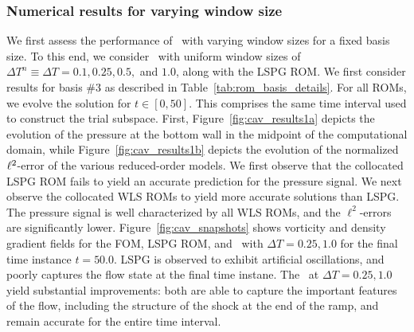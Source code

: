 \subsubsection{Numerical results for varying window size}
We first assess the performance of \methodAcronymROMs\ with varying window sizes for a fixed basis size. To this end, we consider \methodAcronymROMs\ with uniform window 
sizes of $\Delta T^n \equiv \Delta T = 0.1,0.25,0.5,$ and $1.0$, along with the LSPG ROM. We first consider results for basis \#3 as described in 
Table~\ref{tab:rom_basis_details}. For all ROMs, we evolve 
the solution for $t \in [0,50]$. This comprises the same time interval used to construct the trial subspace. First, Figure~\ref{fig:cav_results1a} depicts the evolution of the pressure at the bottom wall in the midpoint of the computational domain, while Figure~\ref{fig:cav_results1b} depicts the evolution of the normalized $\ell^2$-error of the various reduced-order models. We first observe that the collocated LSPG ROM fails to yield an accurate prediction for the pressure signal. We next observe the collocated WLS ROMs to yield more accurate solutions than LSPG. The pressure signal is well characterized by all WLS ROMs, and the $\ell^2$-errors are significantly lower. 
Figure~\ref{fig:cav_snapshots} shows vorticity and density gradient fields for the FOM, LSPG ROM, and \methodAcronymROMs\ with $\Delta T = 0.25,1.0$ for the final time instance $t = 50.0$. LSPG is observed to exhibit artificial oscillations, and poorly captures the flow state at the final time instane. The \methodAcronymROMs\ at $\Delta T = 0.25,1.0$ yield substantial improvements: both are able to capture the important features of the flow, including the structure of the shock at the end of the ramp, and remain accurate for the entire time interval.  







